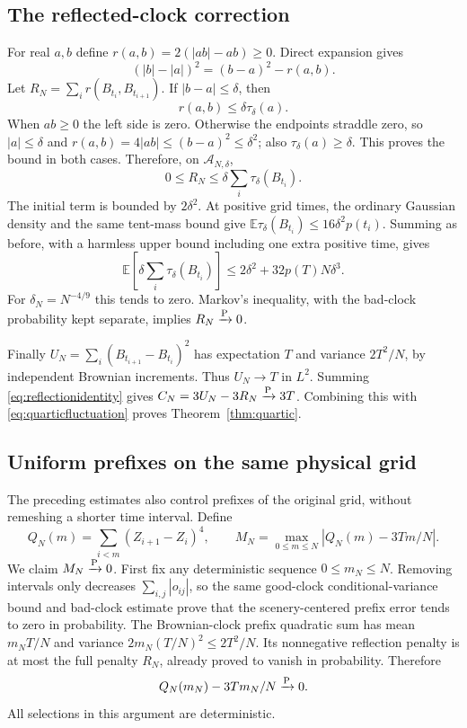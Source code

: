 \documentclass[11pt]{article}
\theoremstyle{remark}\newtheorem{remark}[theorem]{Remark}
\begin{document}
\subsection*{The reflected-clock correction}
For real $a,b$ define $r(a,b)=2(|ab|-ab)\geq0$. Direct expansion gives
\begin{equation}\label{eq:reflectionidentity}
 (|b|-|a|)^2=(b-a)^2-r(a,b).
\end{equation}
Let $R_N=\sum_i r(B_{t_i},B_{t_{i+1}})$.
If $|b-a|\leq\delta$, then
\begin{equation}\label{eq:penaltytent}
 r(a,b)\leq\delta\tau_\delta(a).
\end{equation}
When $ab\geq0$ the left side is zero. Otherwise the endpoints
straddle zero, so $|a|\leq\delta$ and
$r(a,b)=4|ab|\leq(b-a)^2\leq\delta^2$;
also $\tau_\delta(a)\geq\delta$. This proves the bound in both cases.
Therefore, on $\mathcal A_{N,\delta}$,
\[
 0\leq R_N\leq\delta\sum_i\tau_\delta(B_{t_i}).
\]
The initial term is bounded by $2\delta^2$. At positive grid times,
the ordinary Gaussian density and the same tent-mass bound give
$\mathbb E\tau_\delta(B_{t_i})\leq16\delta^2p(t_i)$.
Summing as before, with a harmless upper bound including one extra
positive time, gives
\[
 \mathbb E\left[\delta\sum_i\tau_\delta(B_{t_i})\right]
 \leq2\delta^2+32p(T)N\delta^3.
\]
For $\delta_N=N^{-4/9}$ this tends to zero. Markov's inequality,
with the bad-clock probability kept separate, implies $R_N\xrightarrow{\mathrm P}0$.

Finally $U_N=\sum_i(B_{t_{i+1}}-B_{t_i})^2$ has expectation $T$
and variance $2T^2/N$, by independent Brownian increments. Thus
$U_N\to T$ in $L^2$. Summing \eqref{eq:reflectionidentity} gives
$C_N=3U_N-3R_N\xrightarrow{\mathrm P}3T$. Combining this with
\eqref{eq:quarticfluctuation} proves Theorem~\ref{thm:quartic}.

\subsection*{Uniform prefixes on the same physical grid}
The preceding estimates also control prefixes of the original grid,
without remeshing a shorter time interval. Define
\[
 Q_N(m)=\sum_{i<m}(Z_{i+1}-Z_i)^4,\qquad
 M_N=\max_{0\leq m\leq N}|Q_N(m)-3Tm/N|.
\]
We claim $M_N\xrightarrow{\mathrm P}0$. First fix any deterministic sequence
$0\leq m_N\leq N$. Removing intervals only decreases
$\sum_{i,j}|o_{ij}|$, so the same good-clock conditional-variance
bound and bad-clock estimate prove that the scenery-centered
prefix error tends to zero in probability. The Brownian-clock
prefix quadratic sum has mean $m_NT/N$ and variance
$2m_N(T/N)^2\leq2T^2/N$. Its nonnegative reflection penalty is
at most the full penalty $R_N$, already proved to vanish in
probability. Therefore
\[
 Q_N(m_N)-3Tm_N/N\xrightarrow{\mathrm P}0.
\]
All selections in this argument are deterministic.
\end{document}
